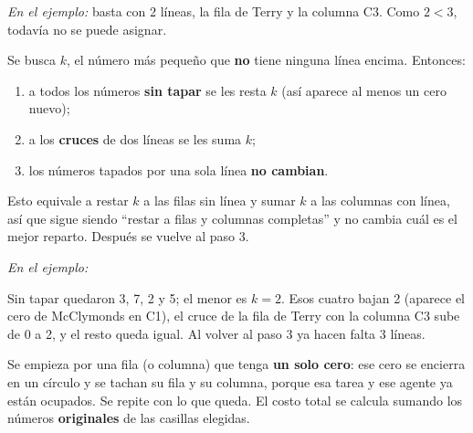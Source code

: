\documentclass[11pt,a4paper]{article}
\let\pasobase\paso
\renewcommand{\paso}[1]{\needspace{7\baselineskip}\pasobase{#1}}
\newcommand{\marco}[3]{%
  \foreach \i in {2,...,#2} \foreach \j in {2,...,#3}
    \draw[gray!60, very thin] (#1-\i-\j.north west) rectangle (#1-\i-\j.south east);
  \draw[semithick] (#1-2-2.north west) rectangle (#1-#2-#3.south east);}
\newcommand{\tfila}[3]{\draw[tapa] (#1-#2-2.west) -- (#1-#2-#3.east);}
\newcommand{\tcol}[3]{\draw[tapa] (#1-2-#2.north) -- (#1-#3-#2.south);}
\newcommand{\flecha}[3]{\draw[-{Stealth[length=2.4mm]}, thick, shorten >=1mm] (#1.east) -- node[above, font=\scriptsize, align=center] {#3} (#1.east -| #2.west);}
\begin{document}
\textit{En el ejemplo:} basta con 2 líneas, la fila de Terry y la columna C3. Como $2 < 3$, todavía no se puede
asignar.

Se busca $k$, el número más pequeño que \textbf{no} tiene ninguna línea encima. Entonces:
\begin{enumerate}[itemsep=2pt]
  \item a todos los números \textbf{sin tapar} se les resta $k$ (así aparece al menos un cero nuevo);
  \item a los \textbf{cruces} de dos líneas se les suma $k$;
  \item los números tapados por una sola línea \textbf{no cambian}.
\end{enumerate}
Esto equivale a restar $k$ a las filas sin línea y sumar $k$ a las columnas con línea, así que sigue siendo
``restar a filas y columnas completas'' y no cambia cuál es el mejor reparto. Después se vuelve al paso 3.

\textit{En el ejemplo:}

\begin{center}
\end{center}
Sin tapar quedaron 3, 7, 2 y 5; el menor es $k = 2$. Esos cuatro bajan 2 (aparece el cero de McClymonds en C1),
el cruce de la fila de Terry con la columna C3 sube de 0 a 2, y el resto queda igual. Al volver al paso 3 ya hacen
falta 3 líneas.

Se empieza por una fila (o columna) que tenga \textbf{un solo cero}: ese cero se encierra en un círculo y se tachan
su fila y su columna, porque esa tarea y ese agente ya están ocupados. Se repite con lo que queda. El costo total se
calcula sumando los números \textbf{originales} de las casillas elegidas.
\end{document}
